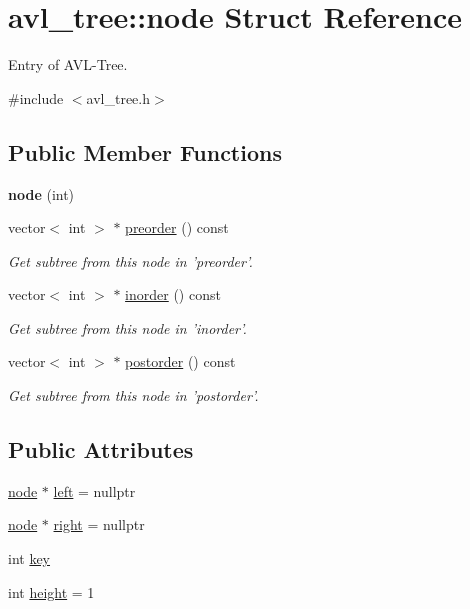 \hypertarget{structavl__tree_1_1node}{\section{avl\-\_\-tree\-:\-:node Struct Reference}
\label{structavl__tree_1_1node}
}


Entry of A\-V\-L-\/\-Tree.  




{\ttfamily \#include $<$avl\-\_\-tree.\-h$>$}

\subsection*{Public Member Functions}
\begin{DoxyCompactItemize}
\item 
\hypertarget{structavl__tree_1_1node_a94e7fa472a575bbcae1e506c4c8b3534}{{\bfseries node} (int)}\label{structavl__tree_1_1node_a94e7fa472a575bbcae1e506c4c8b3534}

\item 
vector$<$ int $>$ $\ast$ \hyperlink{structavl__tree_1_1node_a6932b4c28a69e1adc86f41f74e16cd6e}{preorder} () const 
\begin{DoxyCompactList}\small\item\em Get subtree from this node in 'preorder'. \end{DoxyCompactList}\item 
vector$<$ int $>$ $\ast$ \hyperlink{structavl__tree_1_1node_ac0a51c1a20c50c9c4e0d7037e28afbc2}{inorder} () const 
\begin{DoxyCompactList}\small\item\em Get subtree from this node in 'inorder'. \end{DoxyCompactList}\item 
vector$<$ int $>$ $\ast$ \hyperlink{structavl__tree_1_1node_abe9f3981d8b35f0816657345eeada0a2}{postorder} () const 
\begin{DoxyCompactList}\small\item\em Get subtree from this node in 'postorder'. \end{DoxyCompactList}\end{DoxyCompactItemize}
\subsection*{Public Attributes}
\begin{DoxyCompactItemize}
\item 
\hyperlink{structavl__tree_1_1node}{node} $\ast$ \hyperlink{structavl__tree_1_1node_a3e7851f7104dd71af924b27e70d80f3a}{left} = nullptr
\item 
\hyperlink{structavl__tree_1_1node}{node} $\ast$ \hyperlink{structavl__tree_1_1node_aff21ea47ae19da99113bd7900fb69785}{right} = nullptr
\item 
int \hyperlink{structavl__tree_1_1node_a07b67fe6e79e2272835dd6485272b823}{key}
\item 
int \hyperlink{structavl__tree_1_1node_a57a93259cb3f71b15fe737a559d8f0cc}{height} = 1
\end{DoxyCompactItemize}


